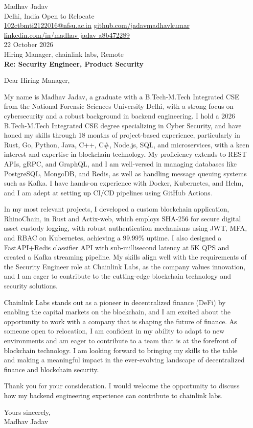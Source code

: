 \documentclass[10pt,letterpaper]{article}
\begin{document}
\begin{flushleft}
Madhav Jadav\\
Delhi, India \textbar{} Open to Relocate\\
\href{mailto:102ctbmti2122016@nfsu.ac.in}{102ctbmti2122016@nfsu.ac.in} \textbar{} \href{https://github.com/jadavmadhavkumar}{github.com/jadavmadhavkumar} \textbar{} \href{https://www.linkedin.com/in/madhav-jadav-a8b472289}{linkedin.com/in/madhav-jadav-a8b472289}\\[8pt]
22 October 2026\\[4pt]
Hiring Manager, chainlink labs, Remote\\[8pt]
\textbf{Re: Security Engineer, Product Security}\\[8pt]
\end{flushleft}
Dear Hiring Manager,

My name is Madhav Jadav, a graduate with a B.Tech-M.Tech Integrated CSE from the National Forensic Sciences University Delhi, with a strong focus on cybersecurity and a robust background in backend engineering. I hold a 2026 B.Tech-M.Tech Integrated CSE degree specializing in Cyber Security, and have honed my skills through 18 months of project-based experience, particularly in Rust, Go, Python, Java, C++, C\#, Node.js, SQL, and microservices, with a keen interest and expertise in blockchain technology. My proficiency extends to REST APIs, gRPC, and GraphQL, and I am well-versed in managing databases like PostgreSQL, MongoDB, and Redis, as well as handling message queuing systems such as Kafka. I have hands-on experience with Docker, Kubernetes, and Helm, and I am adept at setting up CI/CD pipelines using GitHub Actions.

In my most relevant projects, I developed a custom blockchain application, RhinoChain, in Rust and Actix-web, which employs SHA-256 for secure digital asset custody logging, with robust authentication mechanisms using JWT, MFA, and RBAC on Kubernetes, achieving a 99.99\% uptime. I also designed a FastAPI+Redis classifier API with sub-millisecond latency at 5K QPS and created a Kafka streaming pipeline. My skills align well with the requirements of the Security Engineer role at Chainlink Labs, as the company values innovation, and I am eager to contribute to the cutting-edge blockchain technology and security solutions.

Chainlink Labs stands out as a pioneer in decentralized finance (DeFi) by enabling the capital markets on the blockchain, and I am excited about the opportunity to work with a company that is shaping the future of finance. As someone open to relocation, I am confident in my ability to adapt to new environments and am eager to contribute to a team that is at the forefront of blockchain technology. I am looking forward to bringing my skills to the table and making a meaningful impact in the ever-evolving landscape of decentralized finance and blockchain security.

Thank you for your consideration. I would welcome the opportunity to discuss how my backend engineering experience can contribute to chainlink labs.

Yours sincerely,\\[8pt]
Madhav Jadav
\end{document}
